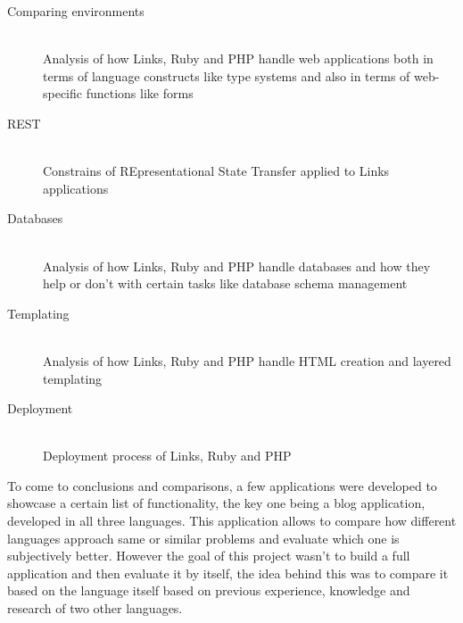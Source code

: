 \begin{description}
  \item[Comparing environments] \hfill \\
  Analysis of how Links, Ruby and PHP handle web applications both in terms of language constructs like type systems and also in terms of web-specific functions like forms
  \item[REST] \hfill \\
  Constrains of REpresentational State Transfer applied to Links applications
  \item[Databases] \hfill \\
  Analysis of how Links, Ruby and PHP handle databases and how they help or don't with certain tasks like database schema management
  \item[Templating] \hfill \\
  Analysis of how Links, Ruby and PHP handle HTML creation and layered templating
  \item[Deployment] \hfill \\
  Deployment process of Links, Ruby and PHP
\end{description}

To come to conclusions and comparisons, a few applications were developed to showcase a certain list of functionality, the key one being a blog application, developed in all three languages. This application allows to compare how different languages approach same or similar problems and evaluate which one is subjectively better. However the goal of this project wasn't to build a full application and then evaluate it by itself, the idea behind this was to compare it based on the language itself based on previous experience, knowledge and research of two other languages.
